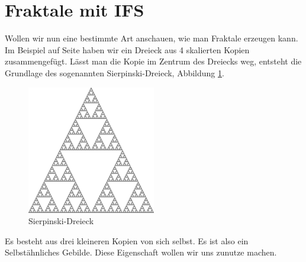 %
%
%
\section{Fraktale mit IFS 
\label{ifs:section:teil2}}
Wollen wir nun eine bestimmte Art anschauen, wie man Fraktale erzeugen kann.
Im Beispiel auf Seite \pageref{ifs:trinagle} haben wir ein Dreieck aus 4 skalierten Kopien zusammengefügt.
Lässt man die Kopie im Zentrum des Dreiecks weg, entsteht die Grundlage des sogenannten Sierpinski-Dreieck, Abbildung \ref{ifs:sierpinski10}.
\begin{figure}
	\centering
	\includegraphics[width=0.5\textwidth]{papers/ifs/images/sierpinski}
	\caption{Sierpinski-Dreieck}
	\label{ifs:sierpinski10}
\end{figure}
Es besteht aus drei kleineren Kopien von sich selbst.
Es ist also ein Selbstähnliches Gebilde.
Diese Eigenschaft wollen wir uns zunutze machen.


